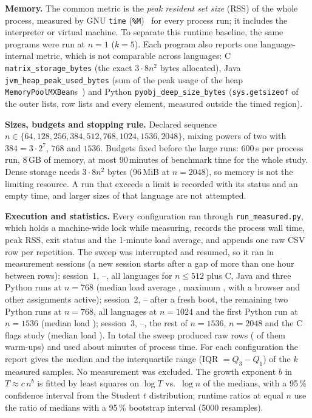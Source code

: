 \documentclass[conference,a4paper]{IEEEtran}
\begin{document}
\textbf{Memory.} The common metric is the \emph{peak resident set size} (RSS) of the whole process, measured by
GNU \texttt{time} (\texttt{\%M})~\cite{gnutime} for every process run; it includes the interpreter or virtual
machine. To separate this runtime baseline, the same programs were run at $n=1$ ($k=5$). Each program also reports
one language-internal metric, which is not comparable across languages: C \texttt{matrix\_storage\_bytes} (the exact
$3\cdot8n^2$ bytes allocated), Java \texttt{jvm\_heap\_peak\_used\_bytes} (sum of the peak usage of the heap
\texttt{MemoryPoolMXBean}s~\cite{javampool}) and Python \texttt{pyobj\_deep\_size\_bytes} (\texttt{sys.getsizeof}
of the outer lists, row lists and every element, measured outside the timed region).

\textbf{Sizes, budgets and stopping rule.} Declared sequence $n\in\{64,128,256,384,512,768,1024,1536,2048\}$,
mixing powers of two with $384=3\cdot2^7$, $768$ and $1536$. Budgets fixed before the large runs: 600\,s per
process run, 8\,GB of memory, at most 90\,minutes of benchmark time for the whole study. Dense storage needs
$3\cdot8n^2$ bytes (96\,MiB at $n=2048$), so memory is not the limiting resource. A run that exceeds a limit is
recorded with its status and an empty time, and larger sizes of that language are not attempted.

\textbf{Execution and statistics.} Every configuration ran through \texttt{run\_measured.py}, which holds a
machine-wide lock while measuring, records the process wall time, peak RSS, exit status and the 1-minute load
average, and appends one raw CSV row per repetition. The sweep was interrupted and resumed, so it ran in
\NumSessions{} measurement sessions (a new session starts after a gap of more than one hour between rows):
session~1, \SessionOneStart{}--\SessionOneEnd{}, all languages for $n\le512$ plus C, Java and three Python runs at
$n=768$ (median load average \SessionOneLoadMedian{}, maximum \SessionOneLoadMax{}, with a browser and other
assignments active); session~2, \SessionTwoStart{}--\SessionTwoEnd{} after a fresh boot, the remaining two Python
runs at $n=768$, all languages at $n=1024$ and the first Python run at $n=1536$ (median load
\SessionTwoLoadMedian{}); session~3, \SessionThreeStart{}--\SessionThreeEnd{}, the rest of $n=1536$, $n=2048$ and
the C flags study (median load \SessionThreeLoadMedian{}). In total the sweep produced \NumRawRows{} raw rows
(\NumWarmupRows{} of them warm-ups) and used about \SweepMachineMinutes{} minutes of process time. For each
configuration the report gives the median and
the interquartile range (IQR $=Q_3-Q_1$) of the $k$ measured samples. No measurement was excluded. The growth
exponent $b$ in $T\approx c\,n^b$ is fitted by least squares on $\log T$ vs.\ $\log n$ of the medians, with a 95\,\%
confidence interval from the Student $t$ distribution; runtime ratios at equal $n$ use the ratio of medians with a
95\,\% bootstrap interval (5000 resamples).
\end{document}
